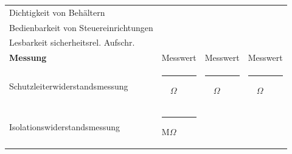 \documentclass[11pt,a4paper,final,oneside,notitlepage]{report}
\begin{document}
\begin{tabularx}{\textwidth}{|p{}| p{}|p{}|p{}|}
		{\scriptsize Dichtigkeit von Behältern } &
		\raggedleft\arraybackslash\makebox[0pt][l]{$\square$}\raisebox{.15ex}{\hspace{0.1em}}\,\,\,\,\,\,\,&
		\cellcolor{gray!10}\raggedleft\arraybackslash\makebox[0pt][l]{$\square$}\raisebox{.15ex}{\hspace{0.1em}}\,\,\,\,\,\,\, &
		\raggedleft\arraybackslash\makebox[0pt][l]{$\square$}\raisebox{.15ex}{\hspace{0.1em}}\,\,\,\,\,\,\,\\
		{\scriptsize Bedienbarkeit von Steuereinrichtungen } &
		\raggedleft\arraybackslash\makebox[0pt][l]{$\square$}\raisebox{.15ex}{\hspace{0.1em}}\,\,\,\,\,\,\,&
		\cellcolor{gray!10}\raggedleft\arraybackslash\makebox[0pt][l]{$\square$}\raisebox{.15ex}{\hspace{0.1em}}\,\,\,\,\,\,\,&
		\raggedleft\arraybackslash\makebox[0pt][l]{$\square$}\raisebox{.15ex}{\hspace{0.1em}}\,\,\,\,\,\,\,\\
		{\scriptsize Lesbarkeit sicherheitsrel. Aufschr. } &
		\raggedleft\arraybackslash\makebox[0pt][l]{$\square$}\raisebox{.15ex}{\hspace{0.1em}}\,\,\,\,\,\,\,&
		\cellcolor{gray!10}\raggedleft\arraybackslash\makebox[0pt][l]{$\square$}\raisebox{.15ex}{\hspace{0.1em}}\,\,\,\,\,\,\, &
		\raggedleft\arraybackslash\makebox[0pt][l]{$\square$}\raisebox{.15ex}{\hspace{0.1em}}\,\,\,\,\,\,\,\\
		\hline
		\rule{0pt}{15pt}\textbf{Messung} & \scriptsize{Messwert} & \cellcolor{gray!10}\scriptsize{Messwert} & \scriptsize{Messwert}  \\[.25ex]
		{\scriptsize Schutzleiterwiderstandsmessung } &
		\rule{0.1\textwidth}{0.05mm}\,\,\,\, $\Omega$
		\raggedleft\arraybackslash\makebox[0pt][l]{$\square$}\raisebox{.15ex}{\hspace{0.1em}}\,\,\,\,\,\,\, &
		\cellcolor{gray!10}\rule{0.1\textwidth}{0.05mm}\,\,\,\, $\Omega$
		\raggedleft\arraybackslash\makebox[0pt][l]{$\square$}\raisebox{.15ex}{\hspace{0.1em}}\,\,\,\,\,\,\, &
		\rule{0.1\textwidth}{0.05mm}\,\,\,\, $\Omega$
		\raggedleft\arraybackslash\makebox[0pt][l]{$\square$}\raisebox{.15ex}{\hspace{0.1em}}\,\,\,\,\,\,\,\\
		{\scriptsize Isolationswiderstandsmessung } &
		\rule{0.1\textwidth}{0.05mm}\hspace{0.5mm} M$\Omega$ \makebox[0pt][l]{$\square$}\raisebox{.15ex}{\hspace{0.1em}} &

\end{tabularx}
\end{document}
